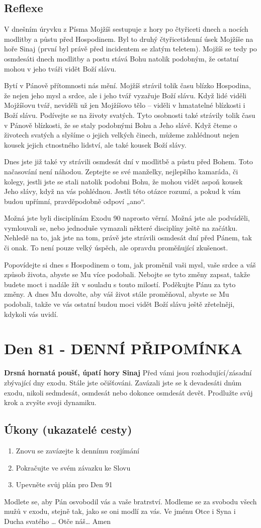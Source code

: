 \documentclass[11pt]{article}
\newcommand{\zacatekDvanactyTyden}{
\textbf{Drsná hornatá poušť, úpatí hory Sinaj} \newline 
Před vámi jsou rozhodující/zásadní zbývající dny exodu. Stále jste očišťováni. Zavázali jste se k devadesáti dnům exodu, nikoli sedmdesát, osmdesát nebo dokonce osmdesát devět. Prodlužte svůj krok a zvyšte svoji dynamiku.

\subsection*{Úkony (ukazatelé cesty)}
\begin{enumerate}
  \item Znovu se zavázejte k dennímu rozjímání
  \item Pokračujte ve svém závazku ke Slovu
  \item Upevněte svůj plán pro Den 91
\end{enumerate}
Modlete se, aby Pán osvobodil vás a vaše bratrství. \newline
Modleme se za svobodu všech mužů v exodu, stejně tak, jako se oni modlí za vás.\newline
Ve jménu Otce i Syna i Ducha svatého …  Otče náš… Amen
}
\begin{document}
\subsection*{Reflexe}
V dnešním úryvku z Písma Mojžíš sestupuje z hory po čtyřiceti dnech a nocích modlitby a půstu před Hospodinem. Byl to druhý
čtyřicetidenní úsek Mojžíše na hoře Sinaj (první byl právě před incidentem se zlatým teletem). Mojžíš se tedy po osmdesáti dnech
modlitby a postu stává Bohu natolik podobným, že ostatní mohou v jeho tváři vidět Boží slávu.

Bytí v Pánově přítomnosti nás mění. Mojžíš strávil tolik času blízko Hospodina, že nejen jeho mysl a srdce, ale i jeho tvář vyzařuje
Boží slávu. Když lidé viděli Mojžíšovu tvář, neviděli už jen Mojžíšovo tělo – viděli v hmatatelné blízkosti i Boží slávu. Podívejte
se na životy svatých. Tyto osobnosti také strávily tolik času v Pánově blízkosti, že se staly podobnými Bohu a Jeho slávě. Když
čteme o životech svatých a slyšíme o jejich velkých činech, můžeme zahlédnout nejen kousek jejich ctnostného lidství, ale také
kousek Boží slávy.

Dnes jste již také vy strávili osmdesát dní v modlitbě a půstu před Bohem. Toto načasování není náhodou. Zeptejte se své
manželky, nejlepšího kamaráda, či kolegy, jestli jste se stali natolik podobni Bohu, že mohou vidět aspoň kousek Jeho slávy, když
na vás pohlédnou. Jestli této otázce rozumí, a pokud k vám budou upřímní, pravděpodobně odpoví „ano“.

Možná jste byli disciplínám Exodu 90 naprosto věrní. Možná jste ale podváděli, vymlouvali se, nebo jednoduše vymazali některé
disciplíny ještě na začátku. Nehledě na to, jak jste na tom, právě jste strávili osmdesát dní před Pánem, tak či onak. To není pouze
velký úspěch, ale opravdu proměňující zkušenost.

Popovídejte si dnes s Hospodinem o tom, jak proměnil vaši mysl, vaše srdce a váš způsob života, abyste se Mu více podobali.
Nebojte se tyto změny zapsat, takže budete moct i nadále žít v souladu s touto milostí. Poděkujte Pánu za tyto změny. A dnes Mu
dovolte, aby váš život stále proměňoval, abyste se Mu podobali, takže ve vás ostatní budou moci vidět Boží slávu ještě zřetelněji,
kdykoli vás uvidí.


\newpage
\section{Den 81 - DENNÍ PŘIPOMÍNKA}
\zacatekDvanactyTyden
\end{document}
